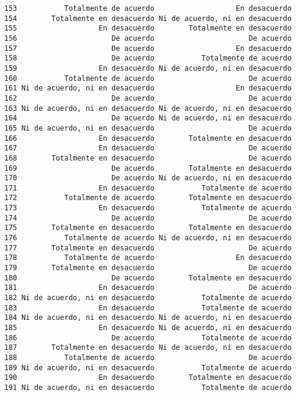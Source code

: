 \documentclass[
  letterpaper,
  DIV=11,
  numbers=noendperiod]{scrartcl}
\begin{document}
\begin{verbatim}
153           Totalmente de acuerdo                   En desacuerdo
154        Totalmente en desacuerdo Ni de acuerdo, ni en desacuerdo
155                   En desacuerdo        Totalmente en desacuerdo
156                      De acuerdo                      De acuerdo
157                      De acuerdo                   En desacuerdo
158                      De acuerdo           Totalmente de acuerdo
159                   En desacuerdo Ni de acuerdo, ni en desacuerdo
160           Totalmente de acuerdo                      De acuerdo
161 Ni de acuerdo, ni en desacuerdo                   En desacuerdo
162                      De acuerdo                      De acuerdo
163 Ni de acuerdo, ni en desacuerdo Ni de acuerdo, ni en desacuerdo
164                      De acuerdo Ni de acuerdo, ni en desacuerdo
165 Ni de acuerdo, ni en desacuerdo                      De acuerdo
166                   En desacuerdo        Totalmente en desacuerdo
167                   En desacuerdo                      De acuerdo
168        Totalmente en desacuerdo                      De acuerdo
169                      De acuerdo        Totalmente en desacuerdo
170                      De acuerdo Ni de acuerdo, ni en desacuerdo
171                   En desacuerdo           Totalmente de acuerdo
172           Totalmente de acuerdo        Totalmente en desacuerdo
173                   En desacuerdo           Totalmente de acuerdo
174                      De acuerdo                      De acuerdo
175        Totalmente en desacuerdo        Totalmente en desacuerdo
176           Totalmente de acuerdo Ni de acuerdo, ni en desacuerdo
177        Totalmente en desacuerdo                      De acuerdo
178           Totalmente de acuerdo                   En desacuerdo
179        Totalmente en desacuerdo                      De acuerdo
180                      De acuerdo        Totalmente en desacuerdo
181                   En desacuerdo                      De acuerdo
182 Ni de acuerdo, ni en desacuerdo           Totalmente de acuerdo
183                   En desacuerdo           Totalmente de acuerdo
184 Ni de acuerdo, ni en desacuerdo Ni de acuerdo, ni en desacuerdo
185                   En desacuerdo Ni de acuerdo, ni en desacuerdo
186                      De acuerdo           Totalmente de acuerdo
187        Totalmente en desacuerdo Ni de acuerdo, ni en desacuerdo
188           Totalmente de acuerdo                      De acuerdo
189 Ni de acuerdo, ni en desacuerdo           Totalmente de acuerdo
190                   En desacuerdo        Totalmente en desacuerdo
191 Ni de acuerdo, ni en desacuerdo           Totalmente de acuerdo

\end{verbatim}
\end{document}

